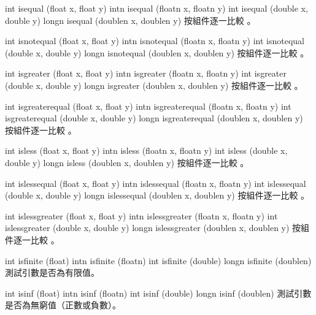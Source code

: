 int isequal (float x, float y)
intn isequal (floatn x, floatn y) 
int isequal (double x, double y)
longn isequal (doublen x, doublen y)
\stopbuffer
{}
按組件逐一比較 。
\stopbuffer

int isnotequal (float x, float y)
intn isnotequal (floatn x, floatn y)
int isnotequal (double x, double y)
longn isnotequal (doublen x, doublen y)
\stopbuffer
{}
按組件逐一比較 。
\stopbuffer

int isgreater (float x, float y)
intn isgreater (floatn x, floatn y)
int isgreater (double x, double y)
longn isgreater (doublen x, doublen y)
\stopbuffer
{}
按組件逐一比較 。
\stopbuffer

int isgreaterequal (float x, float y)
intn isgreaterequal (floatn x, floatn y)
int isgreaterequal (double x,
		double y)
longn isgreaterequal (doublen x,
		doublen y)
\stopbuffer
{}
按組件逐一比較 。
\stopbuffer

int isless (float x, float y)
intn isless (floatn x, floatn y)
int isless (double x, double y)
longn isless (doublen x, doublen y)
\stopbuffer
{}
按組件逐一比較 。
\stopbuffer

int islessequal (float x, float y)
intn islessequal (floatn x, floatn y)
int islessequal (double x, double y)
longn islessequal (doublen x, doublen y)
\stopbuffer
{}
按組件逐一比較 。
\stopbuffer

int islessgreater (float x, float y)
intn islessgreater (floatn x, floatn y)
int islessgreater (double x, double y)
longn islessgreater (doublen x, doublen y)
\stopbuffer
{}
按組件逐一比較 。
\stopbuffer

int isfinite (float)
intn isfinite (floatn)
int isfinite (double)
longn isfinite (doublen)
\stopbuffer
{}
測試引數是否為有限值。
\stopbuffer

int isinf (float)
intn isinf (floatn)
int isinf (double)
longn isinf (doublen)
\stopbuffer
{}
測試引數是否為無窮值（正數或負數）。
\stopbuffer

